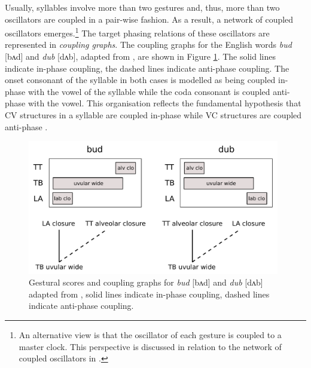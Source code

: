 Usually, syllables involve more than two gestures and, thus, more than two oscillators are coupled in a pair-wise fashion. As a result, a network of coupled oscillators emerges.\footnote{An alternative view is that the oscillator of each gesture is coupled to a master clock. This perspective is discussed in relation to the network of coupled oscillators in \citet{Goldsteinetal2009}.} The target phasing relations of these oscillators are represented in \emph{coupling graphs}. The coupling graphs for the English words \emph{bud} [bʌd] and \emph{dub} [dʌb], adapted from \citet{Mücke2018}, are shown in Figure \ref{fig:bud_dub}. The solid lines indicate in-phase coupling, the dashed lines indicate anti-phase coupling. The onset consonant of the syllable in both cases is modelled as being coupled in-phase with the vowel of the syllable while the coda consonant is coupled anti-phase with the vowel. This organisation reflects the fundamental hypothesis that CV structures in a syllable are coupled in-phase while VC structures are coupled anti-phase \citep{GoldsteinByrdSaltzman2006, Goldsteinetal2009}.

\begin{figure}
\includegraphics[width=11cm]{figures/ch3/bud_dub.pdf}
\caption[Gestural scores and coupling graphs for \emph{bud} and \emph{dub}.]{Gestural scores and coupling graphs for \emph{bud} [bʌd] and \emph{dub} [dʌb] adapted from \citet{Mücke2018}, solid lines indicate in-phase coupling, dashed lines indicate anti-phase coupling.}
\label{fig:bud_dub}
\end{figure}

